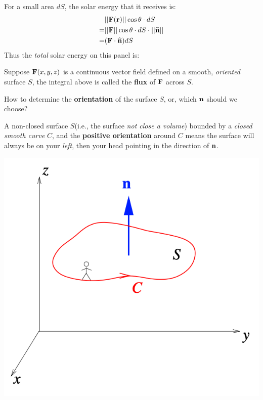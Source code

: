 \begin{spacing}{1.3}
    For a small area $dS$, the solar energy that it receives is:
    \begin{align*}
        &||{\bf F}({\bf r})||\cos\theta\cdot dS \\
        =& ||{\bf F}||\cos\theta\cdot dS\cdot ||\widehat{\bf n}||\\
        =& ({\bf F}\cdot \widehat{\bf n}) dS
    \end{align*}
    Thus the {\it total} solar energy on this panel is: 
    \begin{center}
    \end{center}
    Suppose ${\bf F}(x,y,z)$ is a continuous vector field defined on a smooth, {\it oriented}
    surface $S$, the integral above is called the {\bf flux} of ${\bf F}$ across $S$.

    \vspace{0.4in}
    How to determine the {\bf orientation} of the surface $S$, or, 
    which $\bf{n}$ should we choose?

    A non-closed surface $S$(i.e., the surface {\it not close a volume}) bounded by 
    a {\it closed smooth curve }$C$, and the {\bf positive orientation} around $C$ means 
    the surface will always be on your {\it left}, then your head pointing in the direction of $\bf{n}$.
    \begin{center}
        \includegraphics[scale=0.43]{images/Ch15-oriented-surf.png}
    \end{center}


\end{spacing}
